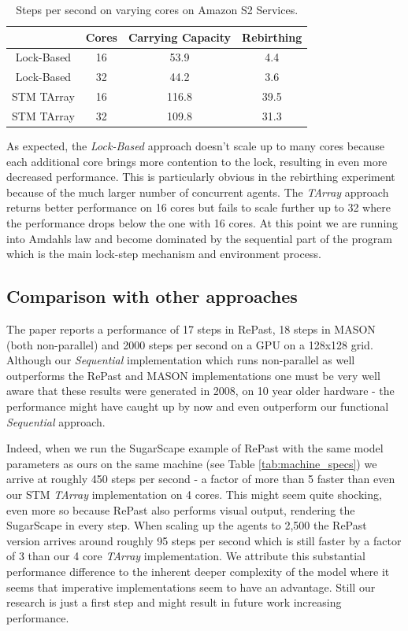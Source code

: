 \begin{table}
	\centering
  	\begin{tabular}{ c || c | c | c }
                   & Cores & Carrying Capacity & Rebirthing \\ \hline \hline 
    	Lock-Based & 16    & 53.9              & 4.4        \\ \hline
    	Lock-Based & 32    & 44.2              & 3.6        \\ \hline \hline 
   		
   		STM TArray & 16    & 116.8             & 39.5       \\ \hline
   		STM TArray & 32    & 109.8             & 31.3       \\ \hline
   	\end{tabular}
  	
  	\caption{Steps per second on varying cores on Amazon S2 Services.}
	\label{tab:varying_cores_amazon}
\end{table}

As expected, the \textit{Lock-Based} approach doesn't scale up to many cores because each additional core brings more contention to the lock, resulting in even more decreased performance. This is particularly obvious in the rebirthing experiment because of the much larger number of concurrent agents. The \textit{TArray} approach returns better performance on 16 cores but fails to scale further up to 32 where the performance drops below the one with 16 cores. At this point we are running into Amdahls law and become dominated by the sequential part of the program which is the main lock-step mechanism and environment process.

\subsection{Comparison with other approaches}
The paper \cite{lysenko_framework_2008} reports a performance of 17 steps in RePast, 18 steps in MASON (both non-parallel) and 2000 steps per second on a GPU on a 128x128 grid. Although our \textit{Sequential} implementation which runs non-parallel as well outperforms the RePast and MASON implementations one must be very well aware that these results were generated in 2008, on 10 year older hardware - the performance might have caught up by now and even outperform our functional \textit{Sequential} approach. 

Indeed, when we run the SugarScape example of RePast with the same model parameters as ours on the same machine (see Table \ref{tab:machine_specs}) we arrive at roughly 450 steps per second - a factor of more than 5 faster than even our STM \textit{TArray} implementation on 4 cores. This might seem quite shocking, even more so because RePast also performs visual output, rendering the SugarScape in every step. When scaling up the agents to 2,500 the RePast version arrives around roughly 95 steps per second which is still faster by a factor of 3 than our 4 core \textit{TArray} implementation. We attribute this substantial performance difference to  the inherent deeper complexity of the model where it seems that imperative implementations seem to have an advantage. Still our research is just a first step and might result in future work increasing performance.

